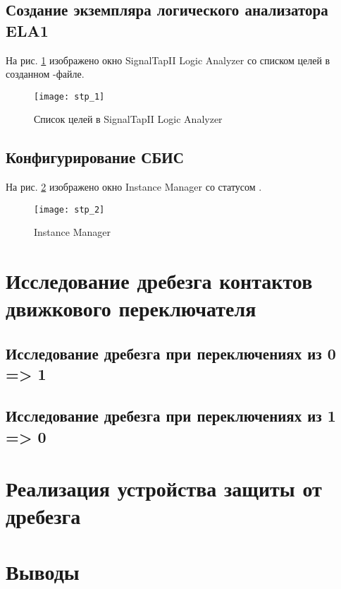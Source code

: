 \subsection{Создание экземпляра логического анализатора ELA1}

На рис. \ref{fig:stp_1} изображено окно SignalTapII Logic Analyzer со списком целей в созданном -файле.
\vspace{-0.5cm}
\begin{figure}[H]
	\begin{center}
		\texttt{[image: stp\_1]}
		\caption{Список целей в SignalTapII Logic Analyzer}
		\label{fig:stp_1}
	\end{center}
\end{figure}

\subsection{Конфигурирование СБИС}

На рис. \ref{fig:stp_2} изображено окно Instance Manager со статусом .
\vspace{-0.5cm}
\begin{figure}[H]
	\begin{center}
		\texttt{[image: stp\_2]}
		\caption{Instance Manager}
		\label{fig:stp_2}
	\end{center}
\end{figure}

\section{Исследование дребезга контактов движкового переключателя}

\subsection{Исследование дребезга при переключениях из 0 => 1}

\subsection{Исследование дребезга при переключениях из 1 => 0}

\section{Реализация устройства защиты от дребезга}

\section{Выводы}

